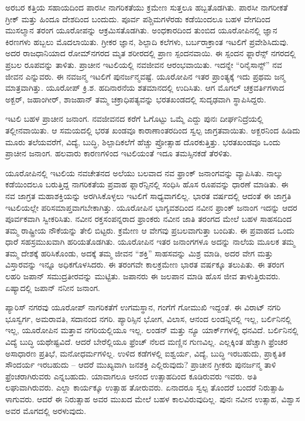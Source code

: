 ಅರಬರ ಕತ್ತಿಯ ಸಹಾಯದಿಂದ ಪಾರಸೀ ನಾಗರಿಕತೆಯು ಕ್ರಮೇಣ ಸುತ್ತಲೂ ಹಬ್ಬತೊಡಗಿತು. ಪಾರಸೀ ನಾಗರೀಕತೆ ಗ್ರೀಕ್​ ಮತ್ತು ಹಿಂದೂ ದೇಶದಿಂದ ಬಂದುದು. ಪೂರ್ವ ಪಶ್ಚಿಮಗಳೆರಡು ಕಡೆಯಿಂದಲೂ ಬಹಳ ವೇಗದಿಂದ ಮುಸಲ್ಮಾನ ತರಂಗ ಯೂರೋಪನ್ನು ಆಕ್ರಮಿಸತೊಡಗಿತು. ಅಂಧಕಾರದಿಂದ ತುಂಬಿದ ಯೂರೋಪಿನಲ್ಲಿ ಜ್ಞಾನ ಕಿರಣಗಳು ಹಬ್ಬಲು ಮೊದಲಾಯಿತು. ಗ್ರೀಕರ ಜ್ಞಾನ, ಶಿಲ್ಪಾದಿ ಕಲೆಗಳು, ಬರ್ಬರಾಕ್ರಾಂತ ಇಟಲಿಗೆ ಪ್ರವೇಶಿಸಿದುವು. ಅದರ ರಾಜಧಾನಿಯಾದ ರೋಮ್​ನಗರದ ಮೃತ ಶರೀರದಲ್ಲಿ ಪ್ರಾಣ ಸ್ಪಂದನವಾಯಿ. ಈ ಸ್ಪಂದನ ಫ್ಲಾರೆನ್ಸ್​ ನಗರದಲ್ಲಿ ಪ್ರಬಲ ರೂಪವನ್ನು ತಾಳಿತು. ಪ್ರಾಚೀನ ಇಟಲಿಯಲ್ಲಿ ನವಜೀವನ ಆರಂಭವಾಯಿತು. ಇದನ್ನೇ “ರಿನೈಸಾನ್ಸ್​” ನವ ಜೀವನ ಎನ್ನುವರು. ಈ ನವಜನ್ಮ ಇಟಲಿಗೆ ಪುನರ್ಜನ್ಮವಷ್ಟೆ. ಯೂರೋಪಿನ ಇತರ ಪ್ರಾಂತ್ಯಕ್ಕೆ ಇದು ಪ್ರಥಮ ಜನ್ಮ ಮಾತ್ರವಾಗಿತ್ತು. ಯೂರೋಪ್​ ಕ್ರಿ.ಶ. ಹದಿನಾರನೆಯ ಶತಮಾನದಲ್ಲಿ ಉದಿಸಿತು. ಆಗ ಮೊಗಲ್​ ಚಕ್ರವರ್ತಿಗಳಾದ ಅಕ್ಬರ್​, ಜಹಾಂಗೀರ್​, ಶಾಜಹಾನ್​ ತಮ್ಮ ಚಕ್ರಾಧಿಪತ್ಯವನ್ನು ಭರತಖಂಡದಲ್ಲಿ ಸುದೃಢವಾಗಿ ಸ್ಥಾಪಿಸಿದ್ದರು.

ಇಟಲಿ ಬಹಳ ಪ್ರಾಚೀನ ಜನಾಂಗ. ನವಜೀವನದ ಕರೆಗೆ ಓಗೊಟ್ಟು ಒಮ್ಮೆ ಎದ್ದು ಪುನಃ ದೀರ್ಘನಿದ್ರೆಯಲ್ಲಿ ತಲ್ಲೀನವಾಯಿತು. ಆ ಸಮಯದಲ್ಲಿ ಭರತ ಖಂಡವೂ ಕಾರಾಣಾಂತರದಿಂದ ಸ್ವಲ್ಪ ಜಾಗ್ರತವಾಯಿತು. ಅಕ್ಬರನಿಂದ ಹಿಡಿದು ಮೂರು ತಲೆಯವರೆಗೆ, ವಿದ್ಯೆ, ಬುದ್ಧಿ, ಶಿಲ್ಪಾದಿಕಲೆಗೆ ಹೆಚ್ಚು ಪ್ರೋತ್ಸಾಹ ದೊರಕುತ್ತಿತ್ತು. ಭರತಖಂಡವೂ ಒಂದು ಪ್ರಾಚೀನ ಜನಾಂಗ. ಹಲವಾರು ಕಾರಣಗಳಿಂದ ಇಟಲಿಯಂತೆ ಇದೂ ತಮಸ್ಸಿನಕಡೆ ತೆರಳಿತು.

ಯೂರೋಪಿನಲ್ಲಿ ಇಟಲಿಯ ನವಚೇತನದ ಅಲೆಯು ಬಲವಾದ ನವ ಫ್ರಾಂಕ್​ ಜನಾಂಗವನ್ನು ವ್ಯಾಪಿಸಿತು. ನಾಲ್ಕು ಕಡೆಯಿಂದಲೂ ಬರುತ್ತಿದ್ದ ನಾಗರಿಕತೆಯ ಪ್ರವಾಹ ಫ್ಲಾರೆನ್ಸಿನಲ್ಲಿ ಸಂಧಿಸಿ ಹೊಸ ರೂಪವನ್ನು ಧಾರಣೆ ಮಾಡಿತು. ಈ ನವ ಜಾಗ್ರತ ಮಹಾಶಕ್ತಿಯನ್ನು ಅರಗಿಸಿಕೊಳ್ಳಲು ಇಟಲಿಗೆ ಸಾಧ್ಯವಾಗಲಿಲ್ಲ. ಭಾರತ ವರ್ಷದಲ್ಲಿ ಆದಂತೆ ಈ ಜಾಗ್ರತಿ ಇಟಲಿಯಲ್ಲೇ ಪರಿಸಮಾಪ್ತವಾಗಬೇಕಾಗಿತ್ತು. ಯೂರೋಪಿನ ಭಾಗ್ಯವಶದಿಂದ ನವೀನ ಫ್ರಾಂಕ್​ ಜನಾಂಗ ಇದನ್ನು ಆದರ ಪೂರ್ವಕವಾಗಿ ಸ್ವೀಕರಿಸಿತು. ನವೀನ ರಕ್ತಸಂಪನ್ನರಾದ ಫ್ರಾಂಕರು ನವೀನ ಜಾತಿ ತರಂಗದ ಮೇಲೆ ಬಹಳ ಸಾಹಸದಿಂದ ತಮ್ಮ ರಾಷ್ಟ್ರೀಯ ನೌಕೆಯನ್ನು ತೇಲಿ ಬಿಟ್ಟರು. ಕ್ರಮೇಣ ಆ ವೇಗವು ಪ್ರಬಲವಾಗುತ್ತಾ ಬಂದಿತು. ಈ ಪ್ರವಾಹದ ಒಂದು ಧಾರೆ ಸಹಸ್ರಮುಖವಾಗಿ ಹರಿಯತೊಡಗಿತು. ಯೂರೋಪಿನ ಇತರ ಜನಾಂಗಗಳೂ ಅದನ್ನು ನಾಲೆಯ ಮೂಲಕ ತಮ್ಮ ತಮ್ಮ ದೇಶಕ್ಕೆ ಹರಿಸಿಕೊಂಡು, ಅದಕ್ಕೆ ತಮ್ಮ ಜೀವನ “ಶಕ್ತಿ” ಸಾಹಸವನ್ನು ಮಿಶ್ರ ಮಾಡಿ, ಅದರ ವೇಗ ಮತ್ತು ವಿಸ್ತಾರವನ್ನು ಇನ್ನೂ ಅಧಿಕಗೊಳಸಿದರು. ಈ ತರಂಗವೇ ಕಾಲಕ್ರಮೇಣ ಭಾರತ ವರ್ಷಕ್ಕೂ ತಲುಪಿತು. ಈ ತರಂಗ ಲಹರಿ ಜಪಾನ್​ ಸಮುದ್ರತೀರವನ್ನು ಮುಟ್ಟಿತು. ಜಪಾನರು ಈ ಜಲಪಾನ ಮಾಡಿ ಹೊಸ ಜೀವ ತಾಳುತ್ತಿರುವರು. ಏಷ್ಯಾದಲ್ಲಿ ಜಪಾನ್​ ನನೀನ ಜನಾಂಗ.

ಪ್ಯಾರಿಸ್​ ನಗರವು ಯೂರೋಪ್​ ನಾಗರಿಕತೆಗೆ ಉಗಮಸ್ಥಾನ, ಗಂಗೆಗೆ ಗೋಮುಖಿ ಇದ್ದಂತೆ. ಈ ವಿರಾಟ್​ ನಗರಿ ಭೂಸ್ವರ್ಗ, ಅಮರಾವತಿ, ಸದಾನಂದ ನಗರಿ. ಪ್ಯಾರಿಸ್ಸಿನ ಭೋಗ, ವಿಲಾಸ, ಆನಂದ ಲಂಡನ್ನಿನಲ್ಲಿ ಇಲ್ಲ, ಬರ್ಲಿನಿನಲ್ಲಿ ಇಲ್ಲ, ಯೂರೋಪಿನ ಮತ್ತಾವ ನಗರಿಯಲ್ಲಿಯೂ ಇಲ್ಲ. ಲಂಡನ್​ ಮತ್ತು ನ್ಯೂ ಯಾರ್ಕ್​ಗಳಲ್ಲಿ ಧನವಿದೆ. ಬರ್ಲಿನಿನಲ್ಲಿ ವಿದ್ಯೆ ಬುದ್ಧಿ ಯಥೇಷ್ಟವಿದೆ. ಆದರೆ ಬೇರೆಲ್ಲಿಯೂ ಫ್ರೆಂಚ್​ ನೆಲದ ಮಣ್ಣಿನ ಗುಣವಿಲ್ಲ. ಎಲ್ಲಕ್ಕಿಂತ ಹೆಚ್ಚಾಗಿ ಫ್ರೆಂಚರ ಅಸಾಧಾರಣ ಪ್ರತಿಭೆ, ಮನೋಧರ್ಮಗಳಿಲ್ಲ. ಉಳಿದ ಕಡೆಗಳಲ್ಲಿ ಐಶ್ವರ್ಯ, ವಿದ್ಯೆ, ಬುದ್ಧಿ ಇರಬಹುದು, ಪ್ರಾಕೃತಿಕ ಸೌಂದರ್ಯ ಇರಬಹುದು – ಆದರೆ ಮುಖ್ಯವಾಗಿ ಜನಶಕ್ತಿ ಎಲ್ಲಿರುವುದು? ಪ್ರಾಚೀನ ಗ್ರೀಕರು ಪುನರ್ಜನ್ಮ ತಾಳಿ ಫ್ರೆಂಚರಾಗಿರುವರು ಎನ್ನಬಹುದು. ಯಾವಾಗಲೂ ಆನಂದ ಉತ್ಸಾಹದಿಂದ ಕೂಡಿರುವರು ಇವರು. ಅತಿ ಲಘುವಾಗಿರುವರು. ಎಲ್ಲಾ ಕಾರ್ಯಕ್ಕೂ ಉತ್ಸಾಹ ತೋರುವರು. ಏನಾದರೂ ಸ್ವಲ್ಪ ತೊಂದರೆ ಬಂದರೆ ನಿರುತ್ಸಾಹಿ ಳಾಗುವರು. ಆದರೆ ಈ ನಿರುತ್ಸಾಹ ಅವರ ಮುಖದ ಮೇಲೆ ಬಹಳ ಕಾಲವಿರುವುದಿಲ್ಲ. ಪುನಃ ನವೀನ ಉತ್ಸಾಹ, ವಿಶ್ವಾಸ ಅವರ ಮೊಗದಲ್ಲಿ ಅರಳುವುದು.

